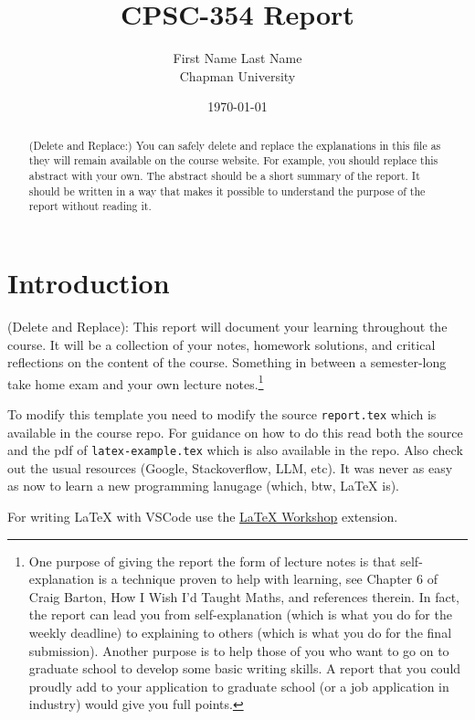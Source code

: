 \documentclass{article}
\title{CPSC-354 Report}
\author{First Name Last Name  \\ Chapman University}
\date{\today}
\theoremstyle{theorem}
\theoremstyle{definition}
\theoremstyle{remark}
\begin{document}
\maketitle

\begin{abstract}
(Delete and Replace:) You can safely delete and replace the explanations in this file as they will remain available on the course website. For example, you should replace this abstract with your own. The abstract should be a short summary of the report. It should be written in a way that makes it possible to understand the purpose of the report without reading it.  
\end{abstract}

\setcounter{tocdepth}{3}
\tableofcontents

\section{Introduction}\label{intro}

(Delete and Replace): This report will document your learning throughout the course. It will be a collection of your notes, homework solutions, and critical reflections on the content of the course. Something in between a semester-long take home exam and your own lecture notes.\footnote{One purpose of giving the report the form of lecture notes is that self-explanation is a technique proven to help with learning, see Chapter 6 of Craig Barton, How I Wish I'd Taught Maths, and references therein. In fact, the report can lead you from self-explanation (which is what you do for the weekly deadline) to explaining to others (which is what you do for the final submission). Another purpose is to help those of you who want to go on to graduate school to develop some basic writing skills. A report that you could proudly add to your application to graduate school (or a job application in industry) would give you full points.}

To modify this template you need to modify the source \texttt{report.tex} which is available in the course repo. For guidance on how to do this read both the source and the pdf of \texttt{latex-example.tex} which is also available in the repo. Also check out the usual resources (Google, Stackoverflow, LLM, etc). It was never as easy as now to learn a new programming lanugage (which, btw, \LaTeX{} is).

For writing \LaTeX{} with VSCode use the \href{https://marketplace.visualstudio.com/items?itemName=James-Yu.latex-workshop}{LaTeX Workshop} extension. 
\end{document}
